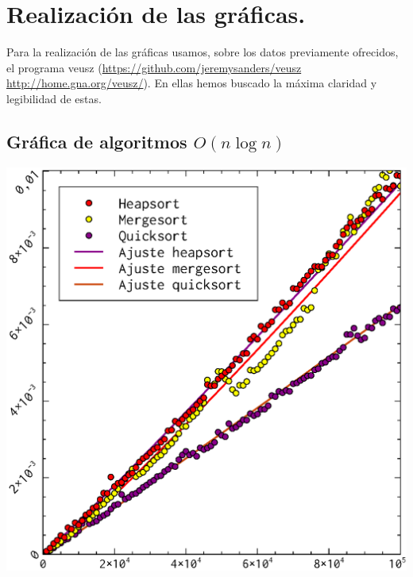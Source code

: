 \documentclass[a4paper, 11pt]{article}
\begin{document}
\section{Realización de las gráficas.}
Para la realización de las gráficas usamos, sobre los datos previamente ofrecidos, el programa veusz (\hyperref[github]{https://github.com/jeremysanders/veusz} \hyperref[pagina oficial]{http://home.gna.org/veusz/}). En  ellas hemos buscado la máxima claridad y legibilidad de estas.

\subsection{Gráfica de algoritmos $O(n\log n)$}
  \includegraphics[]{nlogn_ajuste.eps}
\end{document}
